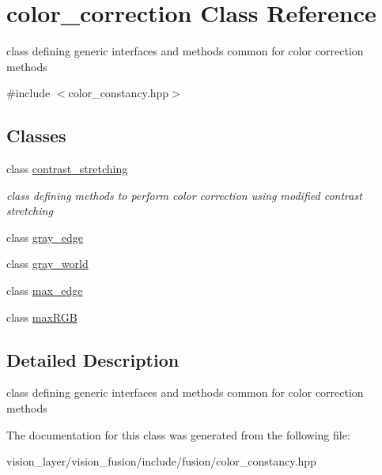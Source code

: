 \hypertarget{classcolor__correction}{}\section{color\+\_\+correction Class Reference}
\label{classcolor__correction}


class defining generic interfaces and methods common for color correction methods  




{\ttfamily \#include $<$color\+\_\+constancy.\+hpp$>$}

\subsection*{Classes}
\begin{DoxyCompactItemize}
\item 
class \hyperlink{classcolor__correction_1_1contrast__stretching}{contrast\+\_\+stretching}
\begin{DoxyCompactList}\small\item\em class defining methods to perform color correction using modified contrast stretching \end{DoxyCompactList}\item 
class \hyperlink{classcolor__correction_1_1gray__edge}{gray\+\_\+edge}
\item 
class \hyperlink{classcolor__correction_1_1gray__world}{gray\+\_\+world}
\item 
class \hyperlink{classcolor__correction_1_1max__edge}{max\+\_\+edge}
\item 
class \hyperlink{classcolor__correction_1_1maxRGB}{max\+R\+GB}
\end{DoxyCompactItemize}


\subsection{Detailed Description}
class defining generic interfaces and methods common for color correction methods 

The documentation for this class was generated from the following file\+:\begin{DoxyCompactItemize}
\item 
vision\+\_\+layer/vision\+\_\+fusion/include/fusion/color\+\_\+constancy.\+hpp\end{DoxyCompactItemize}
